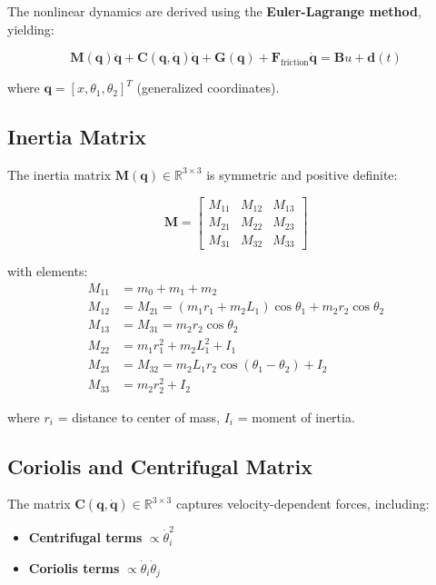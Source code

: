 \documentclass[11pt,a4paper]{article}
\begin{document}
The nonlinear dynamics are derived using the \textbf{Euler-Lagrange method}, yielding:

\begin{equation}
    \mathbf{M}(\mathbf{q})\ddot{\mathbf{q}} + \mathbf{C}(\mathbf{q}, \dot{\mathbf{q}})\dot{\mathbf{q}} + \mathbf{G}(\mathbf{q}) + \mathbf{F}_{\text{friction}}\dot{\mathbf{q}} = \mathbf{B}u + \mathbf{d}(t)
\end{equation}

where $\mathbf{q} = [x, \theta_1, \theta_2]^T$ (generalized coordinates).

\subsection{Inertia Matrix}

The inertia matrix $\mathbf{M}(\mathbf{q}) \in \mathbb{R}^{3 \times 3}$ is symmetric and positive definite:

\begin{equation}
    \mathbf{M} = \begin{bmatrix}
        M_{11} & M_{12} & M_{13} \\
        M_{21} & M_{22} & M_{23} \\
        M_{31} & M_{32} & M_{33}
    \end{bmatrix}
\end{equation}

with elements:
\begin{align}
    M_{11} &= m_0 + m_1 + m_2 \\
    M_{12} &= M_{21} = (m_1 r_1 + m_2 L_1)\cos\theta_1 + m_2 r_2 \cos\theta_2 \\
    M_{13} &= M_{31} = m_2 r_2 \cos\theta_2 \\
    M_{22} &= m_1 r_1^2 + m_2 L_1^2 + I_1 \\
    M_{23} &= M_{32} = m_2 L_1 r_2 \cos(\theta_1 - \theta_2) + I_2 \\
    M_{33} &= m_2 r_2^2 + I_2
\end{align}

where $r_i$ = distance to center of mass, $I_i$ = moment of inertia.

\subsection{Coriolis and Centrifugal Matrix}

The matrix $\mathbf{C}(\mathbf{q}, \dot{\mathbf{q}}) \in \mathbb{R}^{3 \times 3}$ captures velocity-dependent forces, including:
\begin{itemize}
    \item \textbf{Centrifugal terms} $\propto \dot{\theta}_i^2$
    \item \textbf{Coriolis terms} $\propto \dot{\theta}_i \dot{\theta}_j$
\end{itemize}
\end{document}
